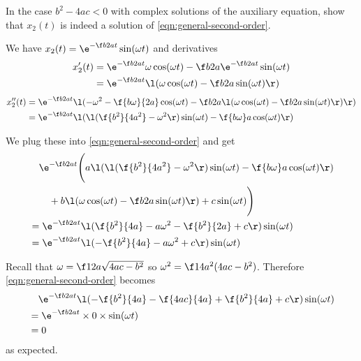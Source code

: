 \documentclass[a4paper]{article}
\begin{document}
\newpage
\subsection{~} %

\begin{questionbody}
In the case $b^2 - 4ac < 0$ with complex solutions of the auxiliary equation, show that $x_2(t)$ is indeed a solution of \eqref{eqn:general-second-order}.
\end{questionbody}

We have $x_2(t) = \e^{-\f b{2a} t} \sin(\omega t)$ and derivatives \begin{align*}
x_2'(t) &= \e^{-\f b{2a} t} \omega \cos(\omega t) - \f b{2a} \e^{-\f b{2a} t} \sin(\omega t) \\
&= \e^{-\f b{2a} t} \l( \omega \cos(\omega t) - \f b{2a} \sin(\omega t) \r)
\end{align*}
\begin{align*}
x_2''(t) &= \e^{-\f b{2a} t} \l(
-\omega^2 - \f{b\omega}{2a} \cos(\omega t)
-\f b{2a} \l( \omega \cos(\omega t) - \f b{2a} \sin(\omega t) \r)
\r) \\
&= \e^{-\f b{2a} t} \l(
\l( \f{b^2}{4a^2} - \omega^2 \r) \sin(\omega t) - \f{b\omega}a \cos(\omega t)
\r)
\end{align*}

We plug these into \eqref{eqn:general-second-order} and get \begin{align*}
&\quad \e^{-\f b{2a} t} \Bigg( a \l( \l( \f{b^2}{4a^2} - \omega^2 \r) \sin(\omega t) - \f{b\omega}a \cos(\omega t) \r) \\
& \qquad + b \l( \omega \cos(\omega t) - \f b{2a} \sin(\omega t) \r) + c \sin(\omega t) \Bigg) \\
%
&= \e^{-\f b{2a} t} \l( \f{b^2}{4a} - a\omega^2 - \f{b^2}{2a} + c \r) \sin(\omega t) \\
&= \e^{-\f b{2a} t} \l( -\f{b^2}{4a} - a\omega^2 + c \r) \sin(\omega t)
\end{align*}

Recall that $\omega = \f1{2a} \sqrt{4ac - b^2}$ so $\omega^2 = \f1{4a^2} (4ac - b^2)$. Therefore \eqref{eqn:general-second-order} becomes \begin{align*}
&\quad \e^{-\f b{2a} t} \l( -\f{b^2}{4a} - \f{4ac}{4a} + \f{b^2}{4a} + c \r) \sin(\omega t) \\
&= \e^{-\f b{2a} t} \times 0 \times \sin(\omega t) \\
&= 0
\end{align*} as expected.
\end{document}
